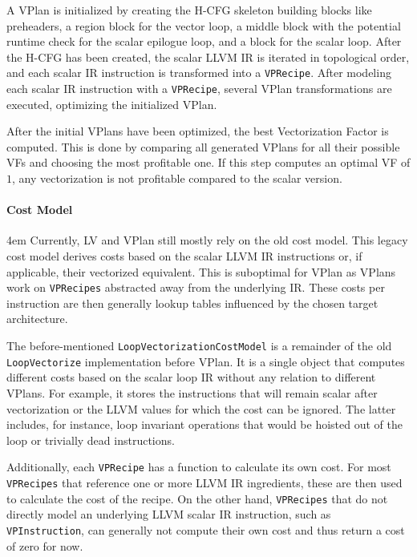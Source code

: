 \documentclass[sigplan,11pt,nonacm]{acmart}
\begin{document}
A VPlan is initialized by creating the H-CFG skeleton building blocks like preheaders, a 
region block for the vector loop, a middle block with the potential runtime check for the scalar 
epilogue loop, and a block for the scalar loop. After the H-CFG has been created, the scalar LLVM IR 
is iterated in topological order, and each scalar IR instruction is transformed into a \texttt{VPRecipe}.
After modeling each scalar IR instruction with a \texttt{VPRecipe}, several VPlan transformations 
are executed, optimizing the initialized VPlan.

After the initial VPlans have been optimized, the best Vectorization Factor is computed. This is done 
by comparing all generated VPlans for all their possible VFs and choosing the most profitable one. If 
this step computes an optimal VF of $1$, any vectorization is not profitable compared to the 
scalar version.

\paragraph{Cost Model}
\emergencystretch 4em
Currently, LV and VPlan still mostly rely on the old cost model. This legacy cost model derives costs 
based on the scalar LLVM IR instructions or, if applicable, their vectorized equivalent.
This is suboptimal for VPlan as VPlans work on \texttt{VPRecipes} abstracted away from the underlying 
IR. These costs per instruction are then generally lookup tables influenced by the chosen target 
architecture.

The before-mentioned \texttt{LoopVectorizationCostModel} is a remainder of the old \texttt{LoopVectorize} 
implementation before VPlan. It is a single object that computes different costs based on the scalar loop 
IR without any relation to different VPlans. For example, it stores the instructions that will remain scalar 
after vectorization or the LLVM values for which the cost can 
be ignored. The latter includes, for instance, loop invariant operations that would be hoisted out of the loop 
or trivially dead instructions.

Additionally, each \texttt{VPRecipe} has a function to calculate its own cost. For most \texttt{VPRecipes} 
that reference one or more LLVM IR ingredients, these are then used to calculate the cost of the recipe.
On the other hand, \texttt{VPRecipes} that do not directly model an underlying LLVM scalar IR instruction, 
such as \texttt{VPInstruction}, can generally not compute their own cost and thus return a cost of zero 
for now.
\end{document}
